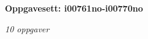 \centerline{\bf Oppgavesett: i00761no-i00770no}
\vskip 10pt
\centerline{\it 10 oppgaver}\vskip 10pt
\vskip 10pt
